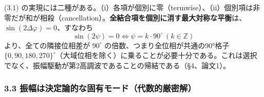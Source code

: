\documentclass[
  a4paper,
]{ltjsarticle}
\begin{document}
(3.1)
の実現には二種がある。（i）各項が個別に零（termwise）、（ii）個別項は非零だが和が相殺（cancellation）。\textbf{全結合項を個別に消す最大対称な平衡}は、\(\sin(2\Delta\varphi)=0\)、すなわち
\[\sin(2\psi)=0\iff \psi=k\cdot90^\circ\ (k\in\mathbb Z)\]
より、全ての隣接位相差が \(90^\circ\)
の倍数、つまり全位相が共通の90°格子
\(\{0,90,180,270\}^\circ\)（大域位相を除く）に乗ることが必要十分である。これは選択でなく、振幅駆動が第2高調波であることの帰結である（§4、論文1）。

\subsubsection{3.3
振幅は決定論的な固有モード（代数的厳密解）}\label{ux632fux5e45ux306fux6c7aux5b9aux8ad6ux7684ux306aux56faux6709ux30e2ux30fcux30c9ux4ee3ux6570ux7684ux53b3ux5bc6ux89e3}
\end{document}

